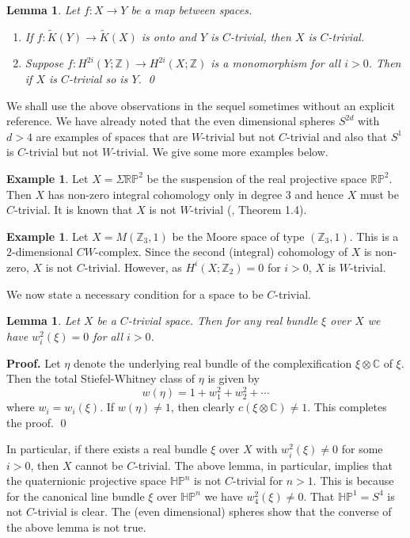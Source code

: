 \documentclass[12pt,reqno]{amsart}
\numberwithin{equation}{subsection}
\newtheorem{Lem}[subsection]{Lemma}
\theoremstyle{definition}
\newtheorem{Exm}[subsection]{Example}
\begin{document}
\begin{Lem}\label{prelim1} 
Let $f:X\longrightarrow Y$ be a map between spaces. 
\begin{enumerate}
\item If $f:\widetilde{K}(Y)\longrightarrow \widetilde{K}(X)$ is onto and $Y$ is $C$-trivial, then $X$ is $C$-trivial. 
\item Suppose $f:H^{2i}(Y;\mathbb Z)\longrightarrow H^{2i}(X;\mathbb Z)$ is a monomorphism for all $i>0$. Then if $X$ is $C$-trivial so is $Y$. \qed
\end{enumerate}
\end{Lem}

We shall use the above observations in the sequel sometimes without an explicit reference. We have already noted that the even dimensional spheres  $S^{2d}$ with $d>4$ are examples of spaces that are $W$-trivial but not $C$-trivial and also that $S^1$ is $C$-trivial but not $W$-trivial. 
We give some more examples below. 
  

\begin{Exm}
Let $X=\Sigma\mathbb R\mathbb P^2$ be the suspension of the real projective space $\mathbb R\mathbb P^2$. Then $X$ has non-zero integral cohomology  only in degree $3$ and hence $X$ must be $C$-trivial. It is known that 
$X$ is not $W$-trivial (\cite{tanaka}, Theorem 1.4).    
\end{Exm} 

\begin{Exm}
Let $X=M(\mathbb Z_3,1)$ be the Moore space of type $(\mathbb Z_3,1)$. This is a $2$-dimensional $CW$-complex. Since the second (integral) cohomology of $X$ is non-zero, $X$ is not $C$-trivial. However, as $H^i(X;\mathbb Z_2)=0$ 
for $i>0$, $X$ is $W$-trivial. 
\end{Exm}

We now state a necessary condition for a space to be $C$-trivial. 

\begin{Lem}
Let $X$ be a $C$-trivial space. Then for any real bundle $\xi$ over $X$ we have $w_i^2(\xi)=0$ for all $i>0$.  
\end{Lem}
{\bf Proof.} Let $\eta$ denote the underlying real bundle of the complexification $\xi\otimes \mathbb C$ of $\xi$. Then the total Stiefel-Whitney class 
of $\eta$ is given by 
$$w(\eta)=1+w_1^2+w_2^2+\cdots$$
where $w_i=w_i(\xi)$. If $w(\eta)\neq 1$, then clearly $c(\xi\otimes \mathbb C)\neq 1$. This completes the proof. \qed

In particular, if there exists a real bundle $\xi$ over $X$ with $w_i^2(\xi)\neq 0$ for some $i>0$, then $X$ cannot be $C$-trivial. 
The above lemma, in particular, implies that the quaternionic projective space $\mathbb H\mathbb P^n$ is not $C$-trivial for $n>1$. This is because for the canonical line bundle $\xi$ over $\mathbb H\mathbb P^n$ we have $w_4^2(\xi)\neq 0$. That $\mathbb H\mathbb P^1=S^4$ is  not $C$-trivial is clear. The (even dimensional) spheres show that the converse of the above lemma is not true. 
\end{document}
